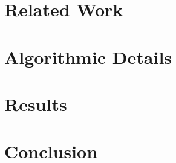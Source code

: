 \documentclass{bmvc2k}
\begin{document}
\section{Related Work}
\label{sec:lit_review}


\section{Algorithmic Details}



\section{Results}
\label{sec:results}


\vspace{-\baselineskip}

\section{Conclusion}
\label{sec:discussion}



\end{document}
